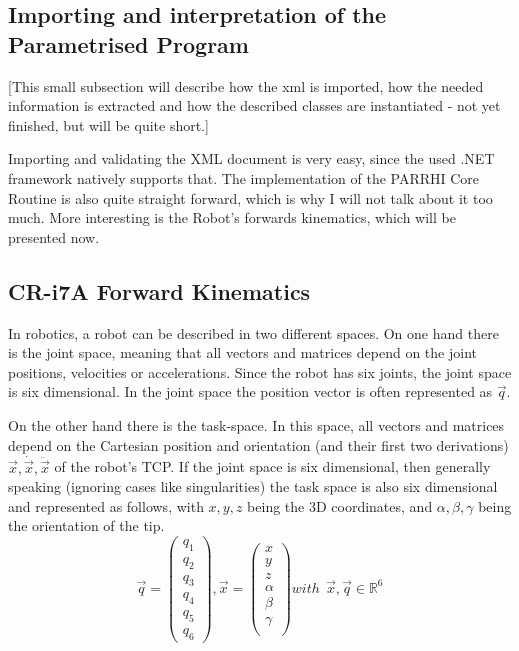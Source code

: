 \subsection{Importing and interpretation of the Parametrised Program}
[This small subsection will describe how the xml is imported, how the needed information is extracted and how the described classes are instantiated - not yet finished, but will be quite short.]

Importing and validating the XML document is very easy, since the used .NET framework natively supports that. The implementation of the PARRHI Core Routine is also quite straight forward, which is why I will not talk about it too much. More interesting is the Robot's forwards kinematics, which will be presented now.

\subsection{CR-i7A Forward Kinematics}\label{Section:ForwardKinematics}
In robotics, a robot can be described in two different spaces. On one hand there is the joint space, meaning that all vectors and matrices depend on the joint positions, velocities or accelerations. Since the robot has six joints, the joint space is six dimensional. In the joint space the position vector is often represented as $ \vec{q} $.

On the other hand there is the task-space. In this space, all vectors and matrices depend on the Cartesian position and orientation (and their first two derivations) $ \vec{x}, \dot{\vec{x}}, \ddot{\vec{x}} $ of the robot's TCP. If the joint space is six dimensional, then generally speaking (ignoring cases like singularities) the task space is also six dimensional and represented as follows, with $x,y,z$ being the 3D coordinates, and $\alpha, \beta, \gamma $ being the orientation of the tip.
\[ \vec{q} = \begin{pmatrix} q_1 \\ q_2 \\ q_3 \\ q_4 \\ q_5 \\ q_6 \end{pmatrix}, \vec{x} = \begin{pmatrix} x \\ y \\ z \\ \alpha \\ \beta \\ \gamma \\ \end{pmatrix} with~~\vec{x},\vec{q} \in \mathbb{R}^6  \]

